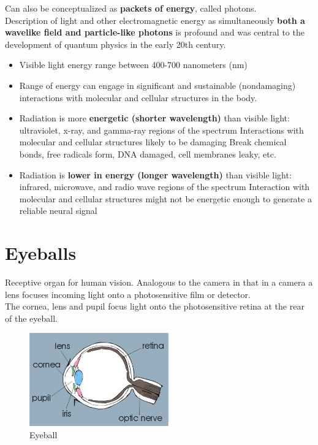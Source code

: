 \documentclass{article}
\begin{document}
\noindent Can also be conceptualized as \textbf{packets of energy}, called photons. \\

\noindent Description of light and other electromagnetic energy as simultaneously\textbf{ both a wavelike field and particle-like photons} is profound and was central to the development of quantum physics in the early 20th century. 

\begin{itemize}
    \item Visible light energy range between 400-700 nanometers (nm) 
    \item Range of energy can engage in significant and sustainable (nondamaging) interactions with molecular and cellular structures in the body. 
    \item Radiation is more \textbf{energetic (shorter wavelength)} than visible light: ultraviolet, x-ray, and gamma-ray regions of the spectrum 
        \subitem Interactions with molecular and cellular structures likely to be damaging
        \subitem Break chemical bonds, free radicals form, DNA damaged, cell membranes leaky, etc. 
    \item Radiation is \textbf{lower in energy (longer wavelength)} than visible light: infrared, microwave, and radio wave regions of the spectrum 
        \subitem Interaction with molecular and cellular structures might not be energetic enough to generate a reliable neural signal
\end{itemize}

\newpage
\section{Eyeballs}
Receptive organ for human vision. Analogous to the camera in that in a camera a lens focuses incoming light onto a photosensitive film or detector. \\
The cornea, lens and pupil focus light onto the photosensitive retina at the rear of the eyeball. \\

\begin{figure}[htp]
\centering
\includegraphics[width=6cm]{images/eyeball.jpg}
\caption{Eyeball}
\label{fig: eyeball}
\end{figure}
\end{document}
